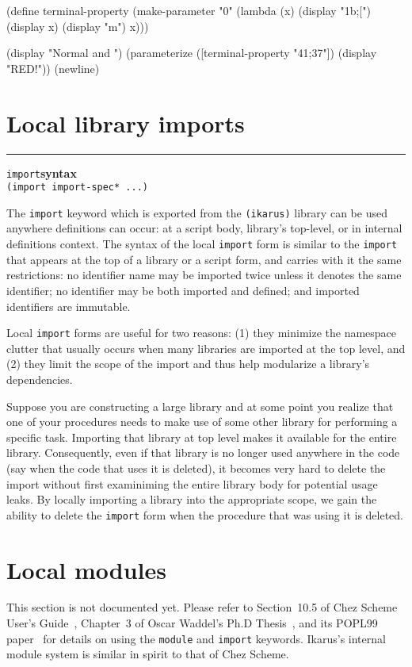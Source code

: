 \documentclass[onecolumn, 12pt, twoside, openright, dvipdfm]{book}
\makeatletter
\newcommand{\idxlabeldefun}[5]{
\vspace{1ex}
\rule{\textwidth}{2pt}
{\phantomsection\index{#1@\texttt{#2}}\label{#3}{\Large\texttt{#4}}\hfill\textbf{#5}}\\}
\newcommand{\idxdefun}[3]{\idxlabeldefun{#1}{#2}{#1}{#2}{#3}}
\newcommand{\defun}[2]{\idxdefun{#1}{#1}{#2}}
\makeatother
\begin{document}
\begin{CodeInline}
(define terminal-property
  (make-parameter "0"
    (lambda (x)
      (display "\x1b;[")
      (display x)
      (display "m")
      x)))

(display "Normal and ")
(parameterize ([terminal-property "41;37"])
  (display "RED!"))
(newline)
\end{CodeInline}

\newpage
\section{Local library imports}
\defun{import}{syntax}
\texttt{(import import-spec* ...)}

The \texttt{import} keyword which is exported from the
\texttt{(ikarus)} library can be used anywhere definitions can
occur: at a script body, library's top-level, or in internal
definitions context.  The syntax of the local \texttt{import} form
is similar to the \texttt{import} that appears at the top of a
library or a script form, and carries with it the same restrictions:
no identifier name may be imported twice unless it denotes the same
identifier; no identifier may be both imported and defined; and
imported identifiers are immutable.

Local \texttt{import} forms are useful for two reasons: (1) they
minimize the namespace clutter that usually occurs when many
libraries are imported at the top level, and (2) they limit the
scope of the import and thus help modularize a library's
dependencies.

Suppose you are constructing a large library and at some point you
realize that one of your procedures needs to make use of some other
library for performing a specific task.  Importing that library at
top level makes it available for the entire library.  Consequently,
even if that library is no longer used anywhere in the code (say
when the code that uses it is deleted), it becomes very hard to
delete the import without first examiniming the entire library body
for potential usage leaks.  By locally importing a library into the
appropriate scope, we gain the ability to delete the \texttt{import}
form when the procedure that was using it is deleted.


\newpage
\section{Local modules}

This section is not documented yet.
Please refer to Section~10.5 of Chez Scheme
User's Guide~\cite{csug7}, Chapter~3 of Oscar Waddel's Ph.D
Thesis~\cite{waddell-thesis}, and its POPL99
paper~\cite{waddell-extending} for details on using the
\texttt{module} and \texttt{import} keywords.  Ikarus's internal
module system is similar in spirit to that of Chez Scheme.
\end{document}
